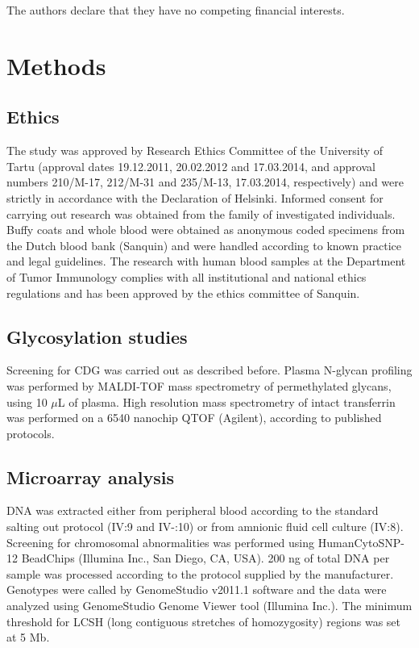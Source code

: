 The authors declare that they have no competing financial interests.

\clearpage

\section{Methods}

\subsection{Ethics}

The study was approved by Research Ethics Committee of the University of Tartu (approval dates 19.12.2011, 20.02.2012 and 17.03.2014, and approval numbers 210/M-17, 212/M-31 and 235/M-13, 17.03.2014, respectively) and were strictly in accordance with the Declaration of Helsinki. Informed consent for carrying out research was obtained from the family of investigated individuals. Buffy coats and whole blood were obtained as anonymous coded specimens from the Dutch blood bank (Sanquin) and were handled according to known practice and legal guidelines. The research with human blood samples at the Department of Tumor Immunology complies with all institutional and national ethics regulations and has been approved by the ethics committee of Sanquin.

\subsection{Glycosylation studies}

Screening for CDG was carried out as described before\cite{jansen_ccdc115_2016}. Plasma N-glycan profiling was performed by MALDI-TOF mass spectrometry of permethylated glycans\cite{morelle_analysis_2007}, using 10 $\mu$L of plasma. High resolution mass spectrometry of intact transferrin was performed on a 6540 nanochip QTOF (Agilent), according to published protocols\cite{van_scherpenzeel_high-resolution_2015}.

\subsection{Microarray analysis}

DNA was extracted either from peripheral blood according to the standard salting out protocol (IV:9 and IV-:10) or from amnionic fluid cell culture (IV:8). Screening for chromosomal abnormalities was performed using HumanCytoSNP-12 BeadChips (Illumina Inc., San Diego, CA, USA). 200 ng of total DNA per sample was processed according to the protocol supplied by the manufacturer. Genotypes were called by GenomeStudio v2011.1 software and the data were analyzed using GenomeStudio Genome Viewer tool (Illumina Inc.). The minimum threshold for LCSH (long contiguous stretches of homozygosity) regions was set at 5 Mb.

